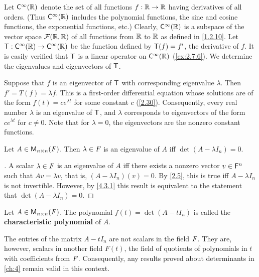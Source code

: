 \begin{eg}\label{5.1.4}
	Let \(\cfs[\infty](\R)\) denote the set of all functions \(f : \mathbb{R} \to \mathbb{R}\) having derivatives of all orders.
	(Thus \(\cfs[\infty](\R)\) includes the polynomial functions, the sine and cosine functions, the exponential functions, etc.)
	Clearly, \(\cfs[\infty](\R)\) is a subspace of the vector space \(\mathcal{F}(\mathbb{R}, \mathbb{R})\) of all functions from \(\mathbb{R}\) to \(\mathbb{R}\) as defined in \cref{1.2.10}.
	Let \(\T : \cfs[\infty](\R) \to \cfs[\infty](\R)\) be the function defined by \(\mathsf{T}(f) = f'\), the derivative of \(f\).
	It is easily verified that \(\mathsf{T}\) is a linear operator on \(\cfs[\infty](\R)\) (\cref{ex:2.7.6}).
	We determine the eigenvalues and eigenvectors of \(\mathsf{T}\).

	Suppose that \(f\) is an eigenvector of \(\mathsf{T}\) with corresponding eigenvalue \(\lambda\).
	Then \(f' = T(f) = \lambda f\).
	This is a first-order differential equation whose solutions are of the form \(f(t) = ce^{\lambda t}\) for some constant \(c\) (\cref{2.30}).
	Consequently, every real number \(\lambda\) is an eigenvalue of \(\mathsf{T}\), and \(\lambda\) corresponds to eigenvectors of the form \(ce^{\lambda t}\) for \(c \neq 0\).
	Note that for \(\lambda = 0\), the eigenvectors are the nonzero constant functions.
\end{eg}

\begin{thm}\label{5.2}
	Let \(A \in \ms[n][n][\F]\).
	Then \(\lambda \in \mathit{F}\) is an eigenvalue of \(A\) iff \(\det(A - \lambda I_n) = 0\).
\end{thm}

\begin{proof}[]
	A scalar \(\lambda \in \mathit{F}\) is an eigenvalue of \(A\) iff there exists a nonzero vector \(v \in \mathsf{F}^n\) such that \(Av = \lambda v\), that is, \((A - \lambda I_n)(v) = 0\).
	By \cref{2.5}, this is true iff \(A - \lambda I_n\) is not invertible.
	However, by \cref{4.3.1} this result is equivalent to the statement that \(\det(A - \lambda I_n) = 0\).
\end{proof}

\begin{defn}\label{5.1.5}
	Let \(A \in \ms[n][n][\F]\).
	The polynomial \(f(t) = \det(A - t I_n)\) is called the \textbf{characteristic polynomial} of \(A\).
\end{defn}

\begin{note}
	The entries of the matrix \(A - t I_n\) are not scalars in the field \(\mathit{F}\).
	They are, however, scalars in another field \(F(t)\), the field of quotients of polynomials in \(t\) with coefficients from \(\mathit{F}\).
	Consequently, any results proved about determinants in \cref{ch:4} remain valid in this context.
\end{note}

